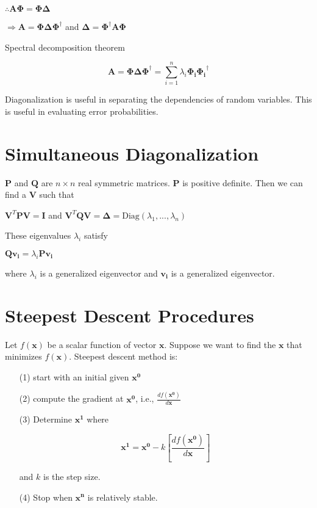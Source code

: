 \documentclass[fleqn]{article}
\begin{document}
	$\therefore \mathbf{A\Phi} = \mathbf{\Phi\Delta}$
	
	$\Rightarrow \mathbf{A} = \mathbf{\Phi\Delta}\mathbf{\Phi}^{\dag}$ and $\mathbf{\Delta} = \mathbf{\Phi}^{\dag}\mathbf{A\Phi}$
	
	Spectral decomposition theorem
	
	\begin{equation*}
		\mathbf{A} = \mathbf{\Phi\Delta}\mathbf{\Phi}^{\dag} = \sum_{i=1}^{n}\lambda_i\mathbf{\Phi_i}\mathbf{\Phi_i}^{\dag}
	\end{equation*}
	
	Diagonalization is useful in separating the dependencies of random variables. This is useful in evaluating error probabilities.
	
	\section{Simultaneous Diagonalization}
	
	$\mathbf{P}$ and $\mathbf{Q}$ are $n \times n$ real symmetric matrices. $\mathbf{P}$ is positive definite. Then we can find a $\mathbf{V}$ such that
	
	$\mathbf{V}^T\mathbf{PV} = \mathbf{I}$ and $\mathbf{V}^T\mathbf{QV} = \mathbf{\Delta} = \text{Diag}(\lambda_1,...,\lambda_n)$
	
	These eigenvalues $\lambda_i$ satisfy
	
	$\mathbf{Qv_i} = \lambda_i\mathbf{Pv_i}$
	
	where $\lambda_i$ is a generalized eigenvector and $\mathbf{v_i}$ is a generalized eigenvector.
	
	\section{Steepest Descent Procedures}
	
	Let $f(\mathbf{x})$ be a scalar function of vector $\mathbf{x}$. Suppose we want to find the $\mathbf{x}$ that minimizes $f(\mathbf{x})$. Steepest descent method is:
	
	\begin{enumerate}
	
		\item[(1)] start with an initial given $\mathbf{x^0}$
		
		\item[(2)] compute the gradient at $\mathbf{x^0}$, i.e., $\frac{df(\mathbf{x^0})}{d\mathbf{x}}$
		
		\item[(3)] Determine $\mathbf{x^1}$ where
		
		\begin{equation*}
			\mathbf{x^1} = \mathbf{x^0} - k\left[\frac{df(\mathbf{x^0})}{d\mathbf{x}}\right]
		\end{equation*}
		
		and $k$ is the step size.
		
		\item[(4)] Stop when $\mathbf{x^n}$ is relatively stable.
	\end{enumerate}
	
\end{document}
